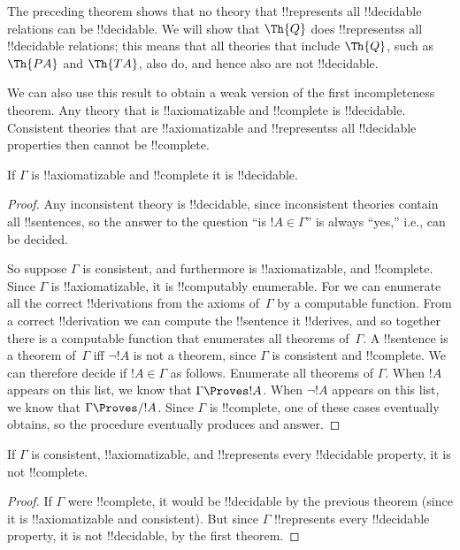 \documentclass[../../../include/open-logic-section]{subfiles}
\begin{document}
\begin{explain}
The preceding theorem shows that no theory that !!{represents} all
!!{decidable} relations can be !!{decidable}. We will show that
$\Th{Q}$ does !!{represents}s all !!{decidable} relations; this means
that all theories that include $\Th{Q}$, such as $\Th{PA}$ and
$\Th{TA}$, also do, and hence also are not !!{decidable}.

We can also use this result to obtain a weak version of the first
incompleteness theorem.  Any theory that is !!{axiomatizable} and
!!{complete} is !!{decidable}.  Consistent theories that are
!!{axiomatizable} and !!{represents}s all !!{decidable} properties
then cannot be !!{complete}.
\end{explain}

\begin{thm}
If $\Gamma$ is !!{axiomatizable} and !!{complete} it is !!{decidable}.
\end{thm}

\begin{proof}
Any inconsistent theory is !!{decidable}, since inconsistent theories
contain all !!{sentence}s, so the answer to the question ``is $!A \in
\Gamma$'' is always ``yes,'' i.e., can be decided.

So suppose $\Gamma$ is consistent, and furthermore is
!!{axiomatizable}, and !!{complete}. Since $\Gamma$ is
!!{axiomatizable}, it is !!{computably enumerable}. For we can
enumerate all the correct !!{derivation}s from the axioms of~$\Gamma$
by a computable function. From a correct !!{derivation} we can compute
the !!{sentence} it !!{derive}s, and so together there is a computable
function that enumerates all theorems of~$\Gamma$.  A !!{sentence} is
a theorem of~$\Gamma$ iff $\lnot !A$ is not a theorem, since $\Gamma$
is consistent and !!{complete}.  We can therefore decide if $!A \in
\Gamma$ as follows. Enumerate all theorems of $\Gamma$. When $!A$
appears on this list, we know that $\Gamma \Proves !A$. When $\lnot
!A$ appears on this list, we know that $\Gamma \Proves/ !A$.  Since
$\Gamma$ is !!{complete}, one of these cases eventually obtains, so
the procedure eventually produces and answer.
\end{proof}

\begin{cor}
If $\Gamma$ is consistent, !!{axiomatizable}, and !!{represents} every
!!{decidable} property, it is not !!{complete}.
\end{cor}

\begin{proof}
If $\Gamma$ were !!{complete}, it would be !!{decidable} by the
previous theorem (since it is !!{axiomatizable} and consistent). But
since $\Gamma$ !!{represents} every !!{decidable} property, it is not
!!{decidable}, by the first theorem.
\end{proof}
\end{document}
